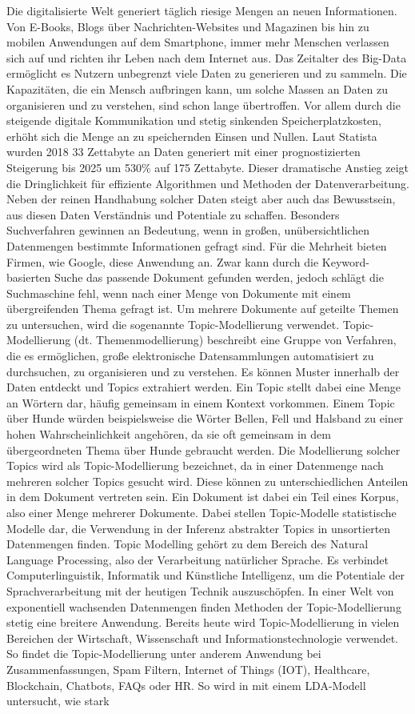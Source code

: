 \documentclass[german,version-2020-11]{uzl-thesis}
\begin{document}
Die digitalisierte Welt generiert täglich riesige Mengen an neuen Informationen. Von E-Books, Blogs über Nachrichten-Websites und Magazinen bis hin zu mobilen Anwendungen auf dem Smartphone, immer mehr Menschen verlassen sich auf und richten ihr Leben nach dem Internet aus. Das Zeitalter des Big-Data ermöglicht es Nutzern unbegrenzt viele Daten zu generieren und zu sammeln. Die Kapazitäten, die ein Mensch aufbringen kann, um solche Massen an Daten zu organisieren und zu verstehen, sind schon lange übertroffen. Vor allem durch die steigende digitale Kommunikation und stetig sinkenden Speicherplatzkosten, erhöht sich die Menge an zu speichernden Einsen und Nullen. Laut Statista \cite{statista}  wurden 2018 33 Zettabyte an Daten generiert mit einer prognostizierten Steigerung bis 2025 um 530\% auf 175 Zettabyte. Dieser dramatische Anstieg zeigt die Dringlichkeit für effiziente Algorithmen und Methoden der Datenverarbeitung. Neben der reinen Handhabung solcher Daten steigt aber auch das Bewusstsein, aus diesen Daten Verständnis und Potentiale zu schaffen. Besonders Suchverfahren gewinnen an Bedeutung, wenn in großen, unübersichtlichen Datenmengen bestimmte Informationen gefragt sind. Für die Mehrheit bieten Firmen, wie Google, diese Anwendung an. Zwar kann durch die Keyword-basierten Suche das passende Dokument gefunden werden, jedoch schlägt die Suchmaschine fehl, wenn nach einer Menge von Dokumente mit einem übergreifenden Thema gefragt ist. Um mehrere Dokumente auf geteilte Themen zu untersuchen, wird die sogenannte Topic-Modellierung verwendet. Topic-Modellierung (dt. Themenmodellierung) beschreibt eine Gruppe von Verfahren, die es ermöglichen, große elektronische Datensammlungen automatisiert zu durchsuchen, zu organisieren und zu verstehen. Es können Muster innerhalb der Daten entdeckt und Topics extrahiert werden. Ein Topic stellt dabei eine Menge an Wörtern dar, häufig gemeinsam in einem Kontext vorkommen. Einem Topic über Hunde würden beispielsweise die Wörter Bellen, Fell und Halsband zu einer hohen Wahrscheinlichkeit angehören, da sie oft gemeinsam in dem übergeordneten Thema über Hunde gebraucht werden. Die Modellierung solcher Topics wird als Topic-Modellierung bezeichnet, da in einer Datenmenge nach mehreren solcher Topics gesucht wird. Diese können zu unterschiedlichen Anteilen in dem Dokument vertreten sein. Ein Dokument ist dabei ein Teil eines Korpus, also einer Menge mehrerer Dokumente. Dabei stellen Topic-Modelle statistische Modelle dar, die Verwendung in der Inferenz abstrakter Topics in unsortierten Datenmengen finden. Topic Modelling gehört zu dem Bereich des Natural Language Processing, also der Verarbeitung natürlicher Sprache. Es verbindet Computerlinguistik, Informatik und Künstliche Intelligenz, um die Potentiale der Sprachverarbeitung mit der heutigen Technik auszuschöpfen. In einer Welt von exponentiell wachsenden Datenmengen finden Methoden der Topic-Modellierung stetig eine breitere Anwendung. Bereits heute wird Topic-Modellierung in vielen Bereichen der Wirtschaft, Wissenschaft und Informationstechnologie verwendet. So findet die Topic-Modellierung unter anderem Anwendung bei Zusammenfassungen, Spam Filtern, Internet of Things (IOT), Healthcare, Blockchain, Chatbots, FAQs oder HR. So wird in \cite{a1} mit einem LDA-Modell untersucht, wie stark 
\end{document}

